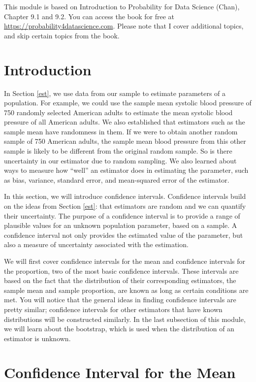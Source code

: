 \documentclass[
]{book}
\begin{document}
This module is based on Introduction to Probability for Data Science (Chan), Chapter 9.1 and 9.2. You can access the book for free at \url{https://probability4datascience.com}. Please note that I cover additional topics, and skip certain topics from the book.

\section{Introduction}\label{introduction-4}

In Section \ref{est}, we use data from our sample to estimate parameters of a population. For example, we could use the sample mean systolic blood pressure of 750 randomly selected American adults to estimate the mean systolic blood pressure of all American adults. We also established that estimators such as the sample mean have randomness in them. If we were to obtain another random sample of 750 American adults, the sample mean blood pressure from this other sample is likely to be different from the original random sample. So is there uncertainty in our estimator due to random sampling. We also learned about ways to measure how ``well'' an estimator does in estimating the parameter, such as bias, variance, standard error, and mean-squared error of the estimator.

In this section, we will introduce confidence intervals. Confidence intervals build on the ideas from Section \ref{est}: that estimators are random and we can quantify their uncertainty. The purpose of a confidence interval is to provide a range of plausible values for an unknown population parameter, based on a sample. A confidence interval not only provides the estimated value of the parameter, but also a measure of uncertainty associated with the estimation.

We will first cover confidence intervals for the mean and confidence intervals for the proportion, two of the most basic confidence intervals. These intervals are based on the fact that the distribution of their corresponding estimators, the sample mean and sample proportion, are known as long as certain conditions are met. You will notice that the general ideas in finding confidence intervals are pretty similar; confidence intervals for other estimators that have known distributions will be constructed similarly. In the last subsection of this module, we will learn about the bootstrap, which is used when the distribution of an estimator is unknown.

\section{Confidence Interval for the Mean}\label{confidence-interval-for-the-mean}
\end{document}
